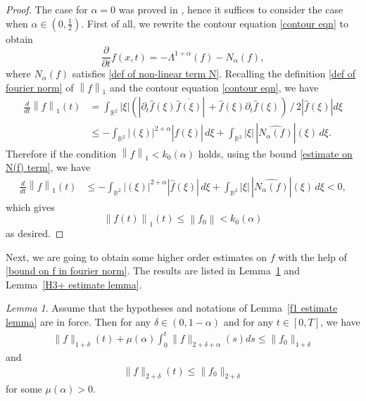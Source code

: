 \documentclass[reqno]{amsart}%
\theoremstyle{definition}
\theoremstyle{remark}
\newtheorem{rem}[thm]{Remark}
\numberwithin{equation}{section}
\newtheorem{lemma}[theorem]{Lemma}
\newcommand{\0}{\mathbf{0}}
\newcommand{\1}{\mathbf{1}}
\numberwithin{equation}{section}
\numberwithin{theorem}{section}
\numberwithin{figure}{section}
\begin{document}
{\begin{proof}
The case for $\alpha=0$ was proved in \cite{constantin2016muskat}, hence it suffices to consider the case when $\alpha\in(0,\frac{1}{2})$. First of all, we rewrite the contour equation \eqref{contour eqn} to obtain
\begin{equation*}
   \frac{\partial}{\partial t} f(x,t) = - \Lambda^{1+\alpha} (f) - N_\alpha(f), 
\end{equation*}
where $N_\alpha (f)$ satisfies \eqref{def of non-linear term N}. Recalling the definition \eqref{def of fourier norm} of \( \left\| f \right\|_{1} \) and the contour equation \eqref{contour eqn}, we have
\begin{equation}\nonumber
\begin{split}
\frac{d}{dt} \left\| f\right\|_{1}(t) &= \int_{\mathbb{R}^{2}}|\xi| \left(|\partial_t\hat{f}(\xi) \overline{\hat{f}(\xi)}|  \, + \hat{f}(\xi) \partial_t\hat{f}(\xi)\right) \, / \, 2 |\hat{f}(\xi)| d\xi  \\
&\leq - \int_{\mathbb{R}^{2}} |(\xi)|^{2+\alpha} |\hat{f}(\xi)| \, d\xi + \int_{\mathbb{R}^{2}} |\xi| \, |\widehat{N_{\alpha}(f)}|(\xi) \, d\xi.
\end{split}
\end{equation}
Therefore if the condition $\left\|f\right\|_{1} < k_{0}(\alpha)$ holds, using the bound \eqref{estimate on N(f) term}, we have
\begin{align*}
\frac{d}{dt} \left\| f\right\|_{1}(t) &\leq - \int_{\mathbb{R}^{2}} |(\xi)|^{2+\alpha} |\hat{f}(\xi)| \, d\xi + \int_{\mathbb{R}^{2}} |\xi| \, |\widehat{N_{\alpha}(f)}|(\xi) \, d\xi < 0,
\end{align*}
which gives
\begin{equation*}
\left\|f(t)\right\|_{1}(t) \leq \left\|f_0\right\| < k_{0}(\alpha)
\end{equation*}
as desired.
\end{proof}
}
Next, we are going to obtain some higher order estimates on $f$ with the help of \eqref{bound on f in fourier norm}. The results are listed in Lemma~\ref{f1+ estimate lemma} and Lemma~\ref{H3+ estimate lemma}.
\begin{lemma}\label{f1+ estimate lemma}
Assume that the hypotheses and notations of Lemma~\ref{f1 estimate lemma} are in force. Then for any $\delta\in(0,1-\alpha)$ and for any $t\in[0,T]$, we have
\begin{align}\label{bound on f in higher fourier norm 1}
\|f\|_{1+\delta}(t) + \mu(\alpha)\int_0^t\|f\|_{2+\delta+\alpha}(s)ds\le\|f_0\|_{1+\delta}
\end{align}
and
\begin{align}\label{bound on f in higher fourier norm 2}
\|f\|_{2+\delta}(t)\le\|f_0\|_{2+\delta}
\end{align}
for some $\mu(\alpha)>0$.
\end{lemma}
\end{document}
